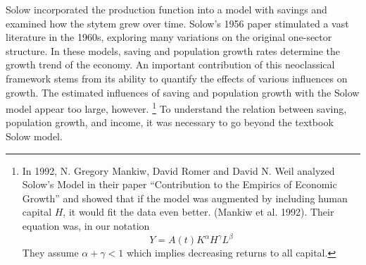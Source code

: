 

Solow incorporated the production function into a model with savings and examined how the stytem grew over time. Solow's 1956 paper stimulated a vast literature in the 1960s, exploring many variations on the original one-sector structure. %
In these models, saving and population growth rates determine the growth trend of the economy. An important  contribution of this neoclassical framework stems from its ability to quantify the effects of various influences on growth. The estimated influences of saving and population growth with the Solow model appear too large, however.%
\footnote{In 1992, N. Gregory Mankiw, David Romer %
and David N. Weil analyzed Solow’s Model in their paper “Contribution to the Empirics of Economic Growth” and  showed that %
if the model was augmented by including human capital $H$, it would fit the data even better.   (Mankiw et al. 1992). Their equation was, in our notation   
\begin{equation*}
Y=A(t)K^\alpha H^\gamma L^\beta 
\end{equation*}
 They assume $\alpha+\gamma<1$ which implies decreasing returns to all capital.} 
To understand the relation between saving, population growth, and income, it was necessary to go beyond the textbook Solow model.%


